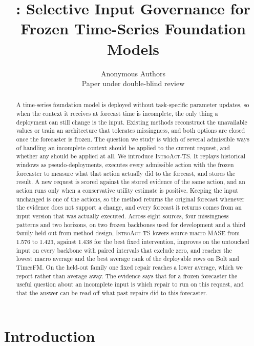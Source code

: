 \documentclass{article}
\title{\introact{}: Selective Input Governance for \\
Frozen Time-Series Foundation Models}
\author{Anonymous Authors\\Paper under double-blind review}
\newcommand{\introact}{\textsc{IntroAct-TS}}
\begin{document}
\maketitle

\begin{abstract}
A time-series foundation model is deployed without task-specific parameter updates, so when the
context it receives at forecast time is incomplete, the only thing a deployment can still
change is the input. Existing methods reconstruct the unavailable values or train an
architecture that tolerates missingness, and both options are closed once the forecaster is
frozen. The question we study is which of several admissible ways of handling an incomplete
context should be applied to the current request, and whether any should be applied at all. We
introduce \introact{}. It replays historical windows as pseudo-deployments, executes every
admissible action with the frozen forecaster to measure what that action actually did to the
forecast, and stores the result. A new request is scored against the stored evidence of the
same action, and an action runs only when a conservative utility estimate is positive.
Keeping the input unchanged is one of the actions, so the method returns the original forecast
whenever the evidence does not support a change, and every forecast it returns comes from an
input version that was actually executed. Across eight sources, four missingness
patterns and two horizons, on two frozen backbones used for development and a third family
held out from method design, \introact{} lowers source-macro MASE from 1.576 to 1.423, against 1.438 for the best fixed intervention, improves on the untouched input on every backbone with paired intervals that exclude zero, and reaches the lowest macro average and the best average rank of the deployable rows on Bolt and TimesFM. On the held-out family one fixed repair reaches a lower average, which we report rather than average away. The evidence says that for a frozen forecaster the useful question about an incomplete input is which repair to run on this request, and that the answer can be read off what past repairs did to this forecaster.
\end{abstract}

\section{Introduction}
\label{sec:intro}
\end{document}
